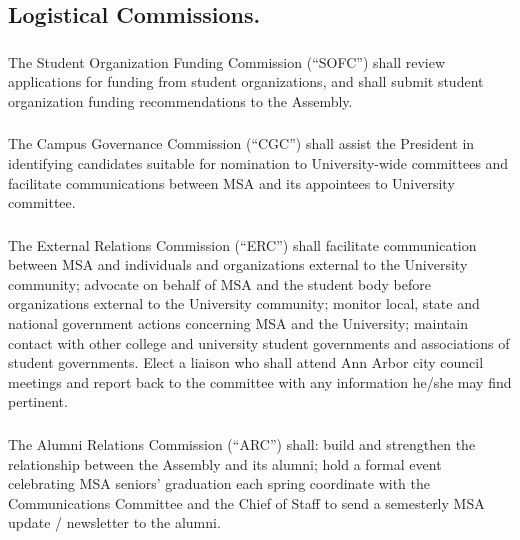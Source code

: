 \subsection{Logistical Commissions.}

\subsubsection{}
The Student Organization Funding Commission (``SOFC'') shall review applications for funding from student organizations, and shall submit student organization funding recommendations to the Assembly.

\subsubsection{}
The Campus Governance Commission (``CGC'') shall assist the President in identifying candidates suitable for nomination to University-wide committees and facilitate communications between MSA and its appointees to University committee.

\subsubsection{}
The External Relations Commission (``ERC'') shall
\subsubsubsection{}
facilitate communication between MSA and individuals and organizations external to the University community;
\subsubsubsection{}
advocate on behalf of MSA and the student body before organizations external to the University community;
\subsubsubsection{}
monitor local, state and national government actions concerning MSA and the University;
\subsubsubsection{}
maintain contact with other college and university student governments and associations of student governments.
\subsubsubsection{}
Elect a liaison who shall attend Ann Arbor city council meetings and report back to the committee with any information he/she may find pertinent.

\subsubsection{}
The Alumni Relations Commission (``ARC'') shall:
\subsubsubsection{}
build and strengthen the relationship between the Assembly and its alumni;
\subsubsubsection{}
hold a formal event celebrating MSA seniors' graduation each spring
\subsubsubsection{}
coordinate with the Communications Committee and the Chief of Staff to send  a semesterly MSA update / newsletter to the alumni.

